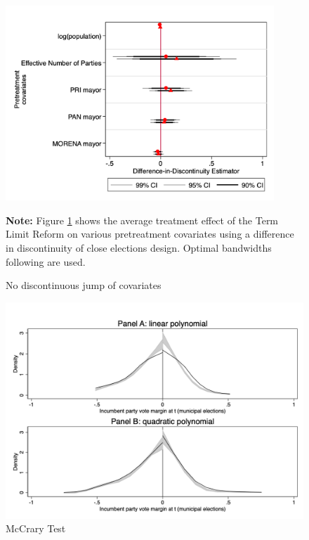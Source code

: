 \documentclass[12pt]{amsart}
\numberwithin{equation}{section}
\theoremstyle{definition}
\theoremstyle{definition}
\theoremstyle{definition}
\begin{document}
\begin{appendix}
\begin{table}[H]
{{\begin{tabular}{l*{1}{ccccc}}
\hline\hline
\end{tabular}    
}
}
\end{table} 
   


 \begin{figure}[h]   
\centering
 \caption{No discontinuous jump of covariates}
 \label{fig:jump_covariates}
\includegraphics[width=0.9\textwidth]{Figures_incumbency/nojump.png}
       \captionsetup{justification=centering}
    
 \textbf{Note:} Figure \ref{fig:jump_covariates} shows the average treatment effect of the Term Limit Reform on various pretreatment covariates using a difference in discontinuity of close elections design. Optimal bandwidths following \citet{calonicoetal_2014} are used. 
   
\end{figure} 

  
    
    
\begin{figure}[h]   
\centering
 \caption{McCrary Test}
 \label{fig:mccrary}
\includegraphics[width=1\textwidth]{Figures_incumbency/mccrary_pol1_2.png}


\end{figure}
\end{appendix}
\end{document}
